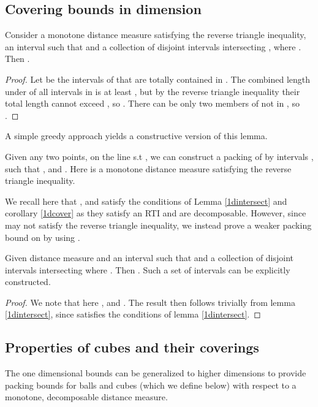 \documentclass[11pt]{myclass}
\begin{document}
\subsection{Covering bounds in  dimension}
\begin{lemma}\label{1dintersect}
Consider a monotone distance measure  satisfying the reverse triangle inequality, an interval  such that  and a
 collection of disjoint intervals intersecting , where . Then  .
\end{lemma}

\begin{proof}
 Let  be the intervals of  that are totally contained in . 
 The combined length under  of all intervals in  is at least , but by the reverse triangle inequality their total length cannot exceed , so . 
 There can be only two members of  not in , so  .
 \end{proof}  

A simple greedy approach yields a constructive version of this lemma. 
\begin{corollary}\label{1dcover}
Given any two points,  on the line s.t , we can construct a packing of  by  intervals ,  such that ,  and . Here  is a monotone distance measure satisfying the reverse triangle inequality.
\end{corollary}

We recall here that ,  and  satisfy the conditions of Lemma \ref{1dintersect} and corollary \ref{1dcover} as they satisfy
an RTI and are decomposable.  However, since   may not satisfy the reverse triangle inequality, we instead prove a weaker 
packing bound on  by using .

\begin{lemma}\label{1dsqrtbregint}
 Given distance measure  and an interval  such that  and a collection of disjoint intervals intersecting 
where . Then  . Such a set of intervals can be explicitly constructed.
\end{lemma}

\begin{proof}
 We note that here , and . The result then follows trivially from lemma \ref{1dintersect},
since  satisfies the conditions of lemma \ref{1dintersect}.
\end{proof}


\subsection{Properties of cubes and their coverings}
 The one dimensional bounds can be generalized to higher dimensions to provide packing bounds for 
balls and cubes (which we define below) with respect to a monotone, decomposable distance measure. 
\end{document}
